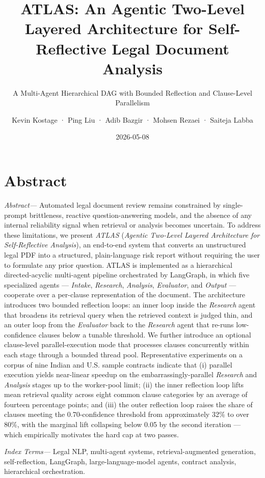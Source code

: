 \documentclass[
  twocolumn]{article}
\title{ATLAS: An Agentic Two-Level Layered Architecture for
Self-Reflective Legal Document Analysis}
\subtitle{A Multi-Agent Hierarchical DAG with Bounded Reflection and
Clause-Level Parallelism}
\author{Kevin Kostage · Ping Liu · Adib Bazgir · Mohsen Rezaei · Saiteja
Labba}
\date{2026-05-08}
\begin{document}
\maketitle

\section{Abstract}\label{abstract}

\emph{Abstract---} Automated legal document review remains constrained
by single-prompt brittleness, reactive question-answering models, and
the absence of any internal reliability signal when retrieval or
analysis becomes uncertain. To address these limitations, we present
\emph{ATLAS} (\emph{Agentic Two-Level Layered Architecture for
Self-Reflective Analysis}), an end-to-end system that converts an
unstructured legal PDF into a structured, plain-language risk report
without requiring the user to formulate any prior question. ATLAS is
implemented as a hierarchical directed-acyclic multi-agent pipeline
orchestrated by LangGraph, in which five specialized agents ---
\emph{Intake}, \emph{Research}, \emph{Analysis}, \emph{Evaluator}, and
\emph{Output} --- cooperate over a per-clause representation of the
document. The architecture introduces two bounded reflection loops: an
inner loop inside the \emph{Research} agent that broadens its retrieval
query when the retrieved context is judged thin, and an outer loop from
the \emph{Evaluator} back to the \emph{Research} agent that re-runs
low-confidence clauses below a tunable threshold. We further introduce
an optional clause-level parallel-execution mode that processes clauses
concurrently within each stage through a bounded thread pool.
Representative experiments on a corpus of nine Indian and U.S. sample
contracts indicate that (i) parallel execution yields near-linear
speedup on the embarrassingly-parallel \emph{Research} and
\emph{Analysis} stages up to the worker-pool limit; (ii) the inner
reflection loop lifts mean retrieval quality across eight common clause
categories by an average of fourteen percentage points; and (iii) the
outer reflection loop raises the share of clauses meeting the
0.70-confidence threshold from approximately 32\% to over 80\%, with the
marginal lift collapsing below 0.05 by the second iteration --- which
empirically motivates the hard cap at two passes.

\emph{Index Terms---} Legal NLP, multi-agent systems,
retrieval-augmented generation, self-reflection, LangGraph,
large-language-model agents, contract analysis, hierarchical
orchestration.
\end{document}
